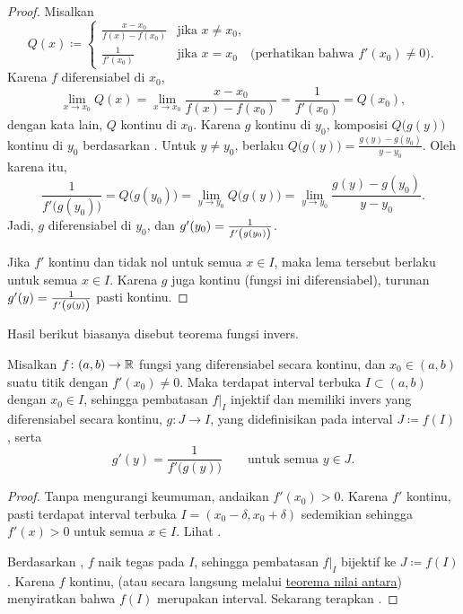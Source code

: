 \begin{proof}
Misalkan
\begin{equation*}
Q(x) \coloneqq
\begin{cases}
\frac{x-x_0}{f(x)-f(x_0)} & \text{jika } x \neq x_0, \\
\frac{1}{f'(x_0)}         & \text{jika } x = x_0 \quad \text{(perhatikan bahwa }
f'(x_0) \neq 0 \text{)}.
\end{cases}
\end{equation*}
Karena $f$ diferensiabel di $x_0$,
\begin{equation*}
\lim_{x \to x_0} Q(x) =
\lim_{x \to x_0} 
\frac{x-x_0}{f(x)-f(x_0)} 
=
\frac{1}{f'(x_0)}
=
Q(x_0) ,
\end{equation*}
dengan kata lain, $Q$ kontinu di $x_0$.
Karena $g$ kontinu di $y_0$,
komposisi $Q\bigl(g(y)\bigr)$ kontinu di $y_0$ berdasarkan
.  Untuk $y \neq y_0$, berlaku
$Q\bigl(g(y)\bigr) = \frac{g(y)-g(y_0)}{y-y_0}$.
Oleh karena itu,
\begin{equation*}
\frac{1}{f'\bigl(g(y_0)\bigr)}
= Q\bigl(g(y_0)\bigr)
= \lim_{y \to y_0} Q\bigl(g(y)\bigr)
= \lim_{y \to y_0} \frac{g(y)-g(y_0)}{y-y_0} .
\end{equation*}
Jadi, $g$ diferensiabel di $y_0$, dan $g'(y_0) =
\frac{1}{f'\left(\vphantom{1^1_1}g(y_0)\right)}$.

Jika $f'$ kontinu dan tidak nol untuk semua $x \in I$,
maka lema tersebut berlaku untuk semua $x \in I$.  Karena $g$ juga
kontinu (fungsi ini diferensiabel), turunan $g'(y) =
\frac{1}{f'\left(\vphantom{1^1_1}g(y)\right)}$ pasti kontinu.
\end{proof}

Hasil berikut biasanya disebut teorema fungsi invers.

\begin{thm}
Misalkan $f \colon (a,b) \to {\mathbb{R}}$ fungsi yang diferensiabel secara kontinu,
dan $x_0 \in (a,b)$ suatu titik dengan $f'(x_0) \neq 0$.  Maka terdapat
interval terbuka $I \subset (a,b)$ dengan $x_0 \in I$, sehingga
pembatasan $f|_{I}$ injektif dan memiliki invers yang diferensiabel secara kontinu,
$g \colon J \to I$, yang didefinisikan pada interval $J \coloneqq f(I)$,
serta
\begin{equation*}
g'(y) = \frac{1}{f'\bigl( g(y) \bigr)} \qquad \text{untuk semua } y \in J.
\end{equation*}
\end{thm}

\begin{proof}
Tanpa mengurangi keumuman, andaikan $f'(x_0) > 0$.  Karena $f'$
kontinu, pasti terdapat interval terbuka $I = (x_0-\delta,x_0+\delta)$
sedemikian sehingga $f'(x) > 0$ untuk semua $x \in I$.  Lihat
.

Berdasarkan , $f$ naik tegas
pada $I$, sehingga pembatasan $f|_{I}$ bijektif ke $J \coloneqq f(I)$.
Karena $f$ kontinu,
(atau secara langsung melalui
\hyperref[IVT:thm]{teorema nilai antara})
menyiratkan bahwa
$f(I)$ merupakan interval.
Sekarang terapkan .
\end{proof}

